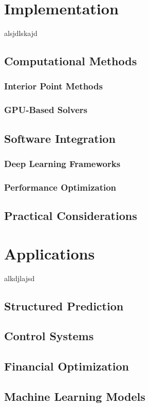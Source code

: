 \documentclass{article}
\begin{document}
\section{Implementation}

alsjdlskajd
\subsection{Computational Methods}
    \subsubsection{Interior Point Methods}
    \subsubsection{GPU-Based Solvers}
\subsection{Software Integration}
    \subsubsection{Deep Learning Frameworks}
    \subsubsection{Performance Optimization}
\subsection{Practical Considerations}

\section{Applications}

alkdjlajsd
\subsection{Structured Prediction}
\subsection{Control Systems}
\subsection{Financial Optimization}
\subsection{Machine Learning Models}
\end{document}
